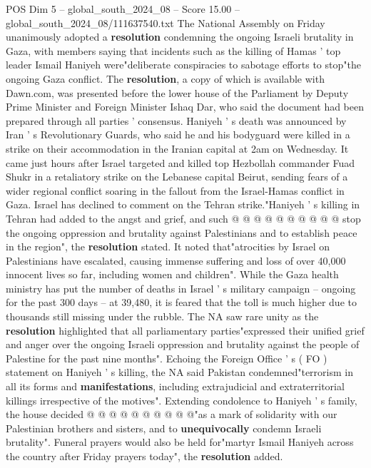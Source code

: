 \begin{textsample}{POS Dim 5 – global\_south\_2024\_08 – Score 15.00 – global\_south\_2024\_08/111637540.txt}  \label{ex:f5_pos_281}
The National Assembly on Friday unanimously adopted a \textbf{resolution} condemning the ongoing Israeli brutality in Gaza, with members saying that incidents such as the killing of Hamas ' top leader Ismail Haniyeh were"deliberate conspiracies to sabotage efforts to stop"the ongoing Gaza conflict.
The \textbf{resolution}, a copy of which is available with Dawn.com, was presented before the lower house of the Parliament by Deputy Prime Minister and Foreign Minister Ishaq Dar, who said the document had been prepared through all parties ' consensus.
Haniyeh ' s death was announced by Iran ' s Revolutionary Guards, who said he and his bodyguard were killed in a strike on their accommodation in the Iranian capital at 2am on Wednesday.
It came just hours after Israel targeted and killed top Hezbollah commander Fuad Shukr in a retaliatory strike on the Lebanese capital Beirut, sending fears of a wider regional conflict soaring in the fallout from the Israel-Hamas conflict in Gaza.
Israel has declined to comment on the Tehran strike."Haniyeh ' s killing in Tehran had added to the angst and grief, and such @ @ @ @ @ @ @ @ @ @ stop the ongoing oppression and brutality against Palestinians and to establish peace in the region", the \textbf{resolution} stated.
It noted that"atrocities by Israel on Palestinians have escalated, causing immense suffering and loss of over 40,000 innocent lives so far, including women and children".
While the Gaza health ministry has put the number of deaths in Israel ' s military campaign -- ongoing for the past 300 days -- at 39,480, it is feared that the toll is much higher due to thousands still missing under the rubble.
The NA saw rare unity as the \textbf{resolution} highlighted that all parliamentary parties"expressed their unified grief and anger over the ongoing Israeli oppression and brutality against the people of Palestine for the past nine months".
Echoing the Foreign Office ' s ( FO ) statement on Haniyeh ' s killing, the NA said Pakistan condemned"terrorism in all its forms and \textbf{manifestations}, including extrajudicial and extraterritorial killings irrespective of the motives".
Extending condolence to Haniyeh ' s family, the house decided @ @ @ @ @ @ @ @ @ @"as a mark of solidarity with our Palestinian brothers and sisters, and to \textbf{unequivocally} condemn Israeli brutality".
Funeral prayers would also be held for"martyr Ismail Haniyeh across the country after Friday prayers today", the \textbf{resolution} added.

\end{textsample}
